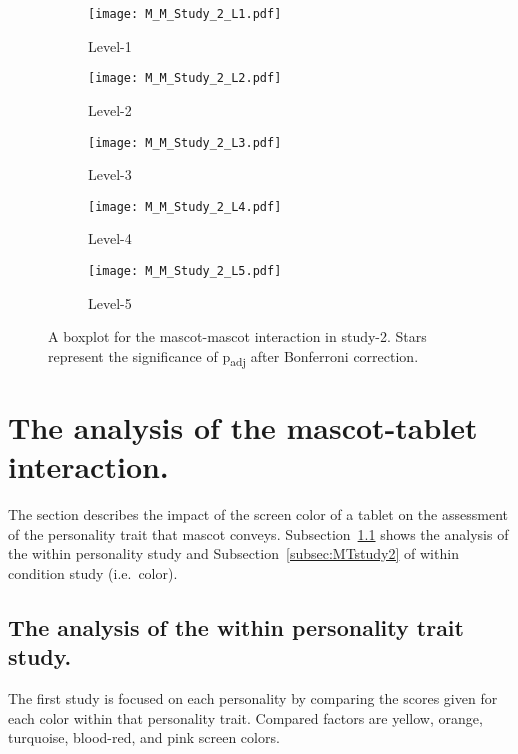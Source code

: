 \begin{figure}[hbt!]
    \centering
    \begin{subfigure}{.40\textwidth}
        \centering
        \texttt{[image: M\_M\_Study\_2\_L1.pdf]}
        \caption{Level-1}
        \label{fig:sub1}
    \end{subfigure}\hfill%
    \begin{subfigure}{.40\textwidth}
        \centering
        \texttt{[image: M\_M\_Study\_2\_L2.pdf]}
        \caption{Level-2}
        \label{fig:sub2}
    \end{subfigure}\hfill
    \begin{subfigure}{.40\textwidth}
        \centering
        \texttt{[image: M\_M\_Study\_2\_L3.pdf]}
        \caption{Level-3}
        \label{fig:sub1}
    \end{subfigure}\hfill%
    \begin{subfigure}{.40\textwidth}
        \centering
        \texttt{[image: M\_M\_Study\_2\_L4.pdf]}
        \caption{Level-4}
        \label{fig:sub1}
    \end{subfigure}\hfill%
    \begin{subfigure}{.40\textwidth}
        \centering
        \texttt{[image: M\_M\_Study\_2\_L5.pdf]}
        \caption{Level-5}
        \label{fig:sub1}
    \end{subfigure}\hfill%
    \caption{A boxplot for the mascot-mascot interaction in study-2.
    Stars represent the significance of p\textsubscript{adj} after Bonferroni correction.}
    \label{fig:MM2}
\end{figure}
\section{The analysis of the mascot-tablet interaction.}
\label{sec:m-t}
The section describes the impact of the screen color of a tablet on the assessment of the
personality trait that mascot conveys.
Subsection~\ref{subsec:MTstudy1} shows the analysis of the within personality study
and Subsection~\ref{subsec:MTstudy2} of within condition study (i.e.\ color).

\subsection{The analysis of the within personality trait study.}
\label{subsec:MTstudy1}
The first study is focused on each personality by comparing the scores given
for each color within that personality trait.
Compared factors are yellow, orange, turquoise, blood-red, and pink screen colors.

